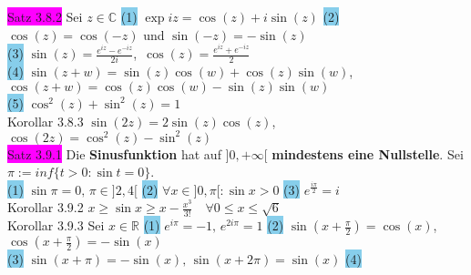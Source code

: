 \documentclass[10pt]{article}
\begin{document}
\colorbox{magenta}{Satz 3.8.2} Sei \textcolor{NavyBlue}{$z\in\mathbb{C}$}
                \colorbox{SkyBlue}{(1)} \textcolor{NavyBlue}{$\exp iz=\cos(z)+i\sin(z)$} 
                \colorbox{SkyBlue}{(2)} \textcolor{NavyBlue}{$\cos(z)=\cos(-z)$} und 
                \textcolor{NavyBlue}{$\sin(-z)=-\sin(z)$}\\
        \indent \colorbox{SkyBlue}{(3)} 
                \textcolor{NavyBlue}{$\sin(z)=\frac{e^{iz}-e^{-iz}}{2i}$},\,
                \textcolor{NavyBlue}{$\cos(z)=\frac{e^{iz}+e^{-iz}}{2}$} \\
        \indent \colorbox{SkyBlue}{(4)} 
                \textcolor{NavyBlue}{$\sin(z+w)=\sin(z)\cos(w)+\cos(z)\sin(w)$},\,
                \textcolor{NavyBlue}{$\cos(z+w)=\cos(z)\cos(w)-\sin(z)\sin(w)$} \\
        \indent \colorbox{SkyBlue}{(5)} \textcolor{NavyBlue}{$\cos^2(z)+\sin^2(z)=1$}\\
\colorbox{BurntOrange}{Korollar 3.8.3} 
                \textcolor{NavyBlue}{$\sin(2z)=2\sin(z)\cos(z)$},\,
                \textcolor{NavyBlue}{$\cos(2z)=\cos^2(z)-\sin^2(z)$}\\
\colorbox{magenta}{Satz 3.9.1} Die \textbf{Sinusfunktion} hat auf 
                \textcolor{NavyBlue}{$]0,+\infty[$}
                \textbf{mindestens eine Nullstelle}. Sei 
                \textcolor{NavyBlue}{$\pi:=inf\{t>0:\sin t=0\}$}.\\
        \indent \colorbox{SkyBlue}{(1)} \textcolor{NavyBlue}{$\sin\pi=0,\,\pi\in]2,4[$} 
                \qquad\qquad
                \colorbox{SkyBlue}{(2)} \textcolor{NavyBlue}{$\forall x\in]0,\pi[:\sin x>0$}
                \qquad\qquad
                \colorbox{SkyBlue}{(3)} \textcolor{NavyBlue}{$e^{\frac{i\pi}{2}}=i$}\\
\colorbox{BurntOrange}{Korollar 3.9.2} \textcolor{NavyBlue}{
                $x\geqslant\sin x\geqslant x-\frac{x^3}{3!}\quad
                \forall0\leqslant x\leqslant\sqrt{6}$}\\
\colorbox{BurntOrange}{Korollar 3.9.3} Sei \textcolor{NavyBlue}{$x\in\mathbb{R}$}
                \colorbox{SkyBlue}{(1)} \textcolor{NavyBlue}{$e^{i\pi}=-1,\,e^{2i\pi}=1$} 
                \colorbox{SkyBlue}{(2)} 
                \textcolor{NavyBlue}{$\sin(x+\frac{\pi}{2})=\cos(x)$},\,
                \textcolor{NavyBlue}{$\cos(x+\frac{\pi}{2})=-\sin(x)$} \\
        \indent \colorbox{SkyBlue}{(3)} 
                \textcolor{NavyBlue}{$\sin(x+\pi)=-\sin(x),\,\sin(x+2\pi)=\sin(x)$}
                \colorbox{SkyBlue}{(4)}
\end{document}
